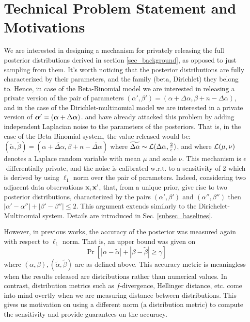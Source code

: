\documentclass{article}
\begin{document}
\section{Technical Problem Statement and Motivations}
\label{sec_moti}
We are interested in designing a mechanism for privately releasing the full posterior
distributions derived in section \ref{sec_background}, as opposed to just sampling from them.
It's worth noticing that the posterior distributions are fully characterized
by their parameters, and the family (beta, Dirichlet) they belong to. Hence, in case of the
Beta-Binomial model we are interested in releasing a private version of the pair of
parameters $(\alpha',\beta')=(\alpha + \Delta \alpha,\beta + n - \Delta \alpha)$, and
in the case of the Dirichlet-multinomial model we are interested in a private version of
$\boldsymbol{\alpha}'=(\boldsymbol{\alpha} + \Delta \boldsymbol{\alpha})$. \cite{zhang2016differential} and \cite{xiao2012bayesian}
have already attacked this problem by adding independent Laplacian noise to the
parameters of the posteriors. That is, in the case of the Beta-Binomial system,
the value released would  be: $(\tilde\alpha,\tilde\beta)=(\alpha +  \widetilde{\Delta \alpha},\beta + n - \widetilde{\Delta \alpha})$
where $\widetilde{\Delta \alpha}\thicksim \mathcal{L}(\Delta \alpha, \frac{2}{\epsilon})$,
and where $\mathcal{L}(\mu, \nu)$ denotes a Laplace random variable with mean $\mu$ and scale $\nu$.
This mechanism is $\epsilon$-differentially private, and the noise is
calibrated w.r.t. to a sensitivity of 2 which is derived by using
$\ell_1$ norm over the pair of parameters. Indeed, considering two
adjacent data observations $\textbf{x}, \textbf{x}'$, that, from a unique prior, give rise to two posterior
distributions, characterized by the pairs
$(\alpha',\beta')$ and $(\alpha'',\beta'')$ then
$|\alpha'-\alpha''|+|\beta'-\beta''|\leq 2$.
This argument extends similarly to the Dirichelet-Multinomial system. Details are introduced in Sec. \ref{subsec_baselines}.

However, in previous works, the accuracy of the posterior was measured again with respect to $\ell_1$ norm. That is, an upper bound was given on
\[
  \Pr[|\alpha - \tilde\alpha| + |\beta - \tilde\beta |\geq \gamma ]
\]
where $(\alpha, \beta), (\tilde\alpha,\tilde\beta)$ are as defined above. This accuracy metric is meaningless when the results released are distributions rather than numerical values. In contrast, distribution metrics such as $f$-divergence, Hellinger distance, etc. come into mind overtly when we are measuring distance between distributions. This gives us motivation on using a different norm (a distribution metric) to compute the sensitivity
and provide guarantees on the accuracy. 
\end{document}

